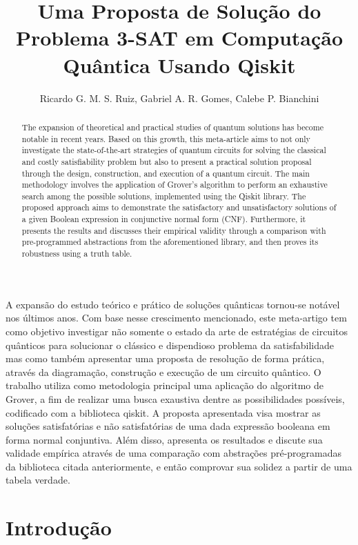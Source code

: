 \documentclass[12pt]{article}
\title{Uma Proposta de Solução do Problema 3-SAT em Computação Quântica Usando Qiskit}
\author{Ricardo G. M. S. Ruiz\inst{1}, Gabriel A. R. Gomes\inst{1}, Calebe P. Bianchini\inst{1}}
\begin{document}
\maketitle

\begin{abstract}
   The expansion of theoretical and practical studies of quantum solutions has become notable in recent years. Based on this growth, this meta-article aims to not only investigate the state-of-the-art strategies of quantum circuits for solving the classical and costly satisfiability problem but also to present a practical solution proposal through the design, construction, and execution of a quantum circuit. The main methodology involves the application of Grover's algorithm to perform an exhaustive search among the possible solutions, implemented using the Qiskit library. The proposed approach aims to demonstrate the satisfactory and unsatisfactory solutions of a given Boolean expression in conjunctive normal form (CNF). Furthermore, it presents the results and discusses their empirical validity through a comparison with pre-programmed abstractions from the aforementioned library, and then proves its robustness using a truth table.
\end{abstract} 
\begin{resumo} 
  A expansão do estudo teórico e prático de soluções quânticas tornou-se notável nos últimos anos. Com base nesse crescimento mencionado, este meta-artigo tem como objetivo investigar não somente o estado da arte de estratégias de circuitos quânticos para solucionar o clássico e dispendioso problema da satisfabilidade mas como também apresentar uma proposta de resolução de forma prática, através da diagramação, construção e execução de um circuito quântico. O trabalho utiliza como metodologia principal uma aplicação do algoritmo de Grover, a fim de realizar uma busca exaustiva dentre as possibilidades possíveis, codificado com a biblioteca qiskit. A proposta apresentada visa mostrar as soluções satisfatórias e não satisfatórias de uma dada expressão booleana em forma normal conjuntiva. Além disso, apresenta os resultados e discute sua validade empírica através de uma comparação com abstrações pré-programadas da biblioteca citada anteriormente, e então comprovar sua solidez a partir de uma tabela verdade.
\end{resumo}


\section{Introdução}
\end{document}
